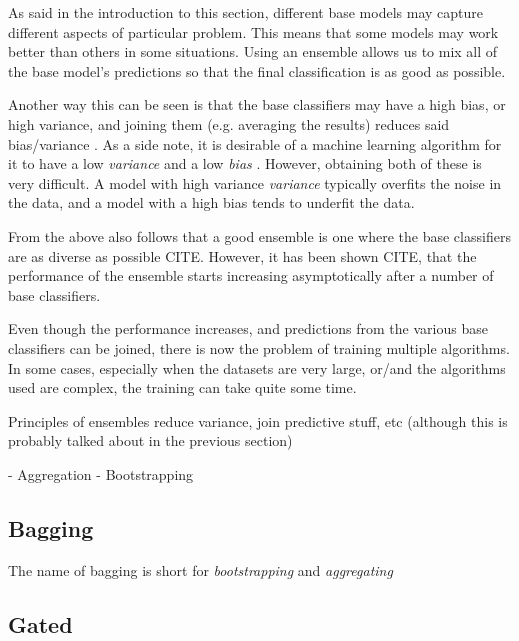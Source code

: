 \documentclass[epsfig,a4paper,11pt,titlepage,twoside,openany]{book}
\begin{document}
As said in the introduction to this section, different base models may capture different aspects of particular problem. This means that some models may work better than others in some situations. Using an ensemble allows us to mix all of the base model's predictions so that the final classification is as good as possible. 

Another way this can be seen is that the base classifiers may have a high bias, or high variance, and joining them (e.g. averaging the results) reduces said bias/variance \cite{Breiman1996_bagging_predictors}. As a side note, it is desirable of a machine learning algorithm for it to have a low \textit{variance} and a low \textit{bias} \cite{Munro2011_bias_variance_decomp}. However, obtaining both of these is very difficult. A model with high variance \textit{variance} typically overfits the noise in the data, and a model with a high bias tends to underfit the data. 

From the above also follows that a good ensemble is one where the base classifiers are as diverse as possible CITE. However, it has been shown CITE, that the performance of the ensemble starts increasing asymptotically after a number of base classifiers. 


Even though the performance increases, and predictions from the various base classifiers can be joined, there is now the problem of training multiple algorithms. In some cases, especially when the datasets are very large, or/and the algorithms used are complex, the training can take quite some time.



Principles of ensembles reduce variance, join predictive stuff, etc (although
this is probably talked about in the previous section)

- Aggregation - Bootstrapping
     
\subsection{Bagging}
\label{sec:ens-bagging}

The name of bagging is short for \textit{bootstrapping} and \textit{aggregating}

\cite{Breiman1996_bagging_predictors}


\subsection{Gated}
\label{sec:ens-gated}
\end{document}
